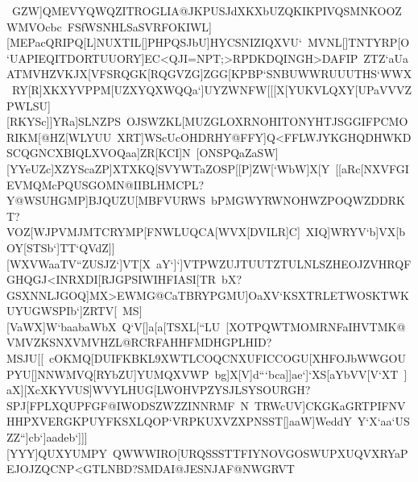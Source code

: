  \hbox{\vbox{\halftone\offinterlineskip %
 \hbox{GZW]QMEVYQWQZITROGLIA@JKPUSJdXKXbUZQKIKPIVQSMNKOOZWMVOcbc%
 FSfWSNHLSaSVRFOKIWL][MEPacQRIPQ[L]NUXTIL[]PHPQSJbU]HYCSNIZIQXVU`%
 MVNL[]TNTYRP[O`UAPIEQITDORTUUORY]EC<QJI=NPT;>RPDKDQINGH>DAFIP}
 \hbox{ZTZ`aUaATMVHZVKJX[VFSRQGK[RQGVZG]ZGG[KPBP`SNBUWWRUUUTHS`WWX%
 RY[R]XKXYVPPM[UZXYQXWQQa`]UYZWNFW[[[X[YUKVLQXY[UPaVVVZPWLSU][RKYSc]]YRa]SLNZPS%
 OJSWZKL[MUZGLOXRNOHITONYHTJSGGIFPCMORIKM[@HZ[WLYUU}
 \hbox{XRT]WScUcOHDRHY@FFY]Q<FFLWJYKGHQDHWKDSCQGNCXBIQLXVOQaa]ZR[KCI]N%
 [ONSPQaZaSW][YYeUZc]XZYScaZP]XTXKQ[SVYWTaZOSP[[P]ZW[`WbW]X[Y%
 [[aRc[NXVFGIEVMQMcPQUSGOMN@IIBLHMCPL?Y@WSUHGMP]BJQUZU[MBFVURWS}
 \hbox{bPMGWYRWNOHWZPOQWZDDRKT?VOZ[WJPVMJMTCRYMP[FNWLUQCA[WVX[DVILR]C]%
 XIQ]WRYV`b]VX[bOY[STSb`]TT`QVdZ]][WXVWaaTV``ZUSJZ`]VT[X%
 aY`]`]VTPWZUJTUUTZTULNLSZHEOJZVHRQFGHQGJ<INRXDI[RJGPSIWIHFIASI[TR}
 \hbox{bX?GSXNNLJGOQ]MX>EWMG@CaTBRYPGMU]OaXV`KSXTRLETWOSKTWKUYUGWSPIb`]ZRTV[%
 MS][VaWX]W`baabaWbX%
 Q`V[]a[a[TSXL[``LU%
 [XOTPQWTMOMRNFaIHVTMK@VMVZKSNXVMVHZL@RCRFAHHFMDHGPLHID?MSJU[[}
 \hbox{cOKMQ[DUIFKBKL9XWTLCOQCNXUFICCOGU[XHFOJbWWGOUPYU[]NNWMVQ[RYbZU]YUMQXVWP%
 bg]X[V]d```bca]]ae`]`XS[aYbVV[V`XT%
 ]aX][XcXKYVUS]WVYLHUG[LWOHVPZYSJLSYSOURGH?SPJ[FPLXQUPFGF@IWODSZWZZINNRMF%
 N}
 \hbox{TRWcUV]CKGKaGRTPIFNVHHPXVERGKPUYFKSXLQOP`VRPKUXVZXPNSST[]aaW]WeddY%
 Y`X`aa`USZZ``]cb`]aadeb`]]][YYY]QUXYUMPY%
 QWWWIRO[URQSSSTTFIYNOVGOSWUPXUQVXRYaPEJOJZQCNP<GTLNBD?SMDAI@JESNJAF@NWGRVT}
}}
